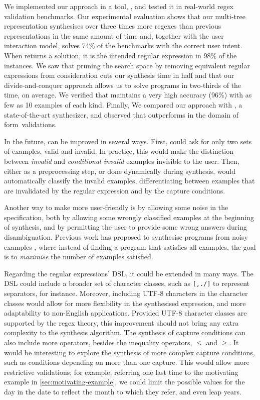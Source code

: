 We implemented our approach in a tool, \Forest{}, and tested it in real-world regex validation benchmarks. Our experimental evaluation shows that our multi-tree representation synthesises over three times more regexes than previous representations in the same amount of time and, together with the user interaction model, \Forest{} solves 74\% of the benchmarks with the correct user intent. When \Forest{} returns a solution, it is the intended regular expression in 98\% of the instances.
%
We saw that pruning the search space by removing equivalent regular expressions from consideration cuts our synthesis time in half and that our divide-and-conquer approach allows us to solve programs in two-thirds of the time, on average.
%
We verified that \Forest{} maintains a very high accuracy (96\%) with
as few as 10 examples of each kind.
Finally, We compared our approach with \Regel{}, a state-of-the-art synthesizer, and observed that \Forest outperforms \Regel in the domain of form~validations.

In the future, \Forest{} can be improved in several ways. First, \Forest could ask for only two sets of examples, valid and invalid. In practice, this would make the distinction between \textit{invalid} and \textit{conditional invalid} examples invisible to the user.
Then, either as a preprocessing step, or done dynamically during synthesis, \Forest would automatically classify the invalid examples, differentiating between examples that are invalidated by the regular expression and by the capture conditions.

Another way to make \Forest more user-friendly is by allowing some noise in the specification, both by allowing some wrongly classified examples at the beginning of synthesis, and by permitting the user to provide some wrong answers during disambiguation. Previous work has proposed to synthesise programs from noisy examples \cite{DanielThesis,ecoop/Peleg20,DBLP:conf/cav/AlmagorK20}, where instead of finding a program that satisfies all examples, the goal is to \textit{maximise} the number of examples satisfied.

Regarding the regular expressions' \ac{DSL}, it could be extended in many ways. The \ac{DSL} could include a broader set of character classes, such as \verb`[,./]` to represent separators, for instance. Moreover, including UTF-8 characters in the character classes would allow for more flexibility in the synthesised expression, and more adaptability to non-English applications. Provided UTF-8 character classes are supported by the regex theory, this improvement should not bring any extra complexity to the synthesis algorithm.
%
The synthesis of capture conditions can also include more operators, besides the inequality operators, \(\le\) and \(\ge\). It would be interesting to explore the synthesis of more complex capture conditions, such as conditions depending on more than one capture. This would allow more restrictive validations; for example, referring one last time to the motivating example in \autoref{sec:motivating-example}, we could limit the possible values for the day in the date to reflect the month to which they refer, and even leap years.

